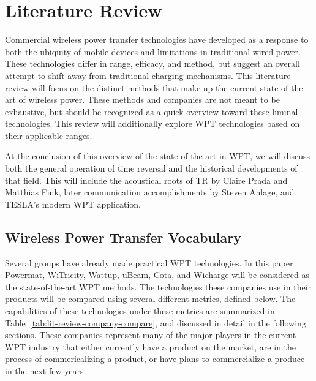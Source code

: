 \chapter{Literature Review}
\label{ch:lit-review}

Commercial wireless power transfer technologies have developed as a response to both the ubiquity of mobile devices and limitations in traditional wired power. These technologies differ in range, efficacy, and method, but suggest an overall attempt to shift away from traditional charging mechanisms. This literature review will focus on the distinct methods that make up the current state-of-the-art of wireless power. These methods and companies are not meant to be exhaustive, but should be recognized as a quick overview toward these liminal technologies. This review will additionally explore WPT technologies based on their applicable ranges.

At the conclusion of this overview of the state-of-the-art in WPT, we will discuss both the general operation of time reversal and the historical developments of that field. This will include the acoustical roots of TR by Claire Prada and Matthias Fink, later communication accomplishments by Steven Anlage, and TESLA's modern WPT application.

\section{Wireless Power Transfer Vocabulary}

Several groups have already made practical WPT technologies. In this paper Powermat, WiTricity, Wattup, uBeam, Cota, and Wicharge will be considered as the state-of-the-art WPT methods. The technologies these companies use in their products will be compared using several different metrics, defined below. The capabilities of these technologies under these metrics are summarized in Table~\ref{tab:lit-review-company-compare}, and discussed in detail in the following sections. These companies represent many of the major players in the current WPT industry that either currently have a product on the market, are in the process of commericalizing a product, or have plans to commercialize a produce in the next few years.

